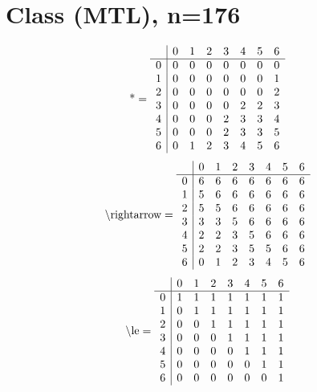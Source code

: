 \documentclass[11pt]{article}
\begin{document}
\section{Class (MTL), n=176}
\[\text{*} = 
\begin{array}{r | r r r r r r r}
 & 0 & 1 & 2 & 3 & 4 & 5 & 6 \\ \hline
0 & 0 & 0 & 0 & 0 & 0 & 0 & 0 \\
1 & 0 & 0 & 0 & 0 & 0 & 0 & 1 \\
2 & 0 & 0 & 0 & 0 & 0 & 0 & 2 \\
3 & 0 & 0 & 0 & 0 & 2 & 2 & 3 \\
4 & 0 & 0 & 0 & 2 & 3 & 3 & 4 \\
5 & 0 & 0 & 0 & 2 & 3 & 3 & 5 \\
6 & 0 & 1 & 2 & 3 & 4 & 5 & 6 \\
\end{array}
\]
\[\text{\textbackslash rightarrow} = 
\begin{array}{r | r r r r r r r}
 & 0 & 1 & 2 & 3 & 4 & 5 & 6 \\ \hline
0 & 6 & 6 & 6 & 6 & 6 & 6 & 6 \\
1 & 5 & 6 & 6 & 6 & 6 & 6 & 6 \\
2 & 5 & 5 & 6 & 6 & 6 & 6 & 6 \\
3 & 3 & 3 & 5 & 6 & 6 & 6 & 6 \\
4 & 2 & 2 & 3 & 5 & 6 & 6 & 6 \\
5 & 2 & 2 & 3 & 5 & 5 & 6 & 6 \\
6 & 0 & 1 & 2 & 3 & 4 & 5 & 6 \\
\end{array}
\]
\[\text{\textbackslash le} = 
\begin{array}{r | r r r r r r r}
 & 0 & 1 & 2 & 3 & 4 & 5 & 6 \\ \hline
0 & 1 & 1 & 1 & 1 & 1 & 1 & 1 \\
1 & 0 & 1 & 1 & 1 & 1 & 1 & 1 \\
2 & 0 & 0 & 1 & 1 & 1 & 1 & 1 \\
3 & 0 & 0 & 0 & 1 & 1 & 1 & 1 \\
4 & 0 & 0 & 0 & 0 & 1 & 1 & 1 \\
5 & 0 & 0 & 0 & 0 & 0 & 1 & 1 \\
6 & 0 & 0 & 0 & 0 & 0 & 0 & 1 \\
\end{array}
\]
\end{document}
